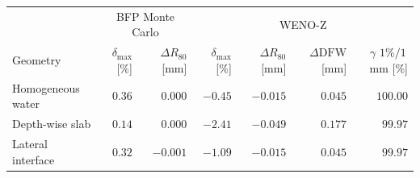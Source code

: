 \begin{tabular}{l rr rrrr}
\toprule
 & \multicolumn{2}{c}{BFP Monte Carlo} & \multicolumn{4}{c}{WENO-Z} \\
\cmidrule(lr){2-3}\cmidrule(lr){4-7}
Geometry & \shortstack{$\delta_{\max}$\\{}[\%]} & \shortstack{$\Delta R_{80}$\\{}[mm]} & \shortstack{$\delta_{\max}$\\{}[\%]} & \shortstack{$\Delta R_{80}$\\{}[mm]} & \shortstack{$\Delta\mathrm{DFW}$\\{}[mm]} & \shortstack{$\gamma$ $1\%/1$\,mm\\{}[\%]} \\
\midrule
Homogeneous water & $0.36$ & $0.000$ & $-0.45$ & $-0.015$ & $0.045$ & $100.00$ \\
Depth-wise slab & $0.14$ & $0.000$ & $-2.41$ & $-0.049$ & $0.177$ & $99.97$ \\
Lateral interface & $0.32$ & $-0.001$ & $-1.09$ & $-0.015$ & $0.045$ & $99.97$ \\
\bottomrule
\end{tabular}
